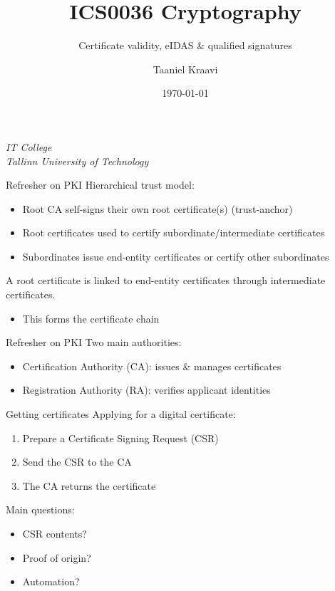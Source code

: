 \graphicspath{ {../../images/} }
\usetikzlibrary{external}
\usepackage{changepage}

\newlength{\offset}

\title{ICS0036 Cryptography}
\subtitle{Certificate validity, eIDAS \& qualified signatures}
\date{\today}
\author{Taaniel Kraavi}
\institute%
{%
  \textit{IT College}\\
  \textit{Tallinn University of Technology}
}


\begin{frame}
  \titlepage
\end{frame}

\begin{frame}{Refresher on PKI}
  Hierarchical trust model:
  \begin{itemize}[<+(1)->]
    \item Root CA self-signs their own root certificate(s) (trust-anchor)
    \item Root certificates used to certify subordinate/intermediate certificates
    \item Subordinates issue end-entity certificates or certify other subordinates
  \end{itemize}

  \vspace*{1em}

  \pause
  A root certificate is linked to end-entity certificates through intermediate certificates.
  \begin{itemize}[<+(1)->]
    \item This forms the certificate chain
  \end{itemize}
\end{frame}

\begin{frame}{Refresher on PKI}
  Two main authorities:
  \begin{itemize}[<+(1)->]
    \item Certification Authority (CA): issues \& manages certificates
    \item Registration Authority (RA): verifies applicant identities
  \end{itemize}
\end{frame}

\begin{frame}{Getting certificates}
  Applying for a digital certificate:
  \begin{enumerate}[<+(1)->]
    \item Prepare a Certificate Signing Request (CSR)
    \item Send the CSR to the CA
    \item The CA returns the certificate
  \end{enumerate}

  \vspace*{1em}

  \pause
  Main questions:
  \begin{itemize}
    \item CSR contents?
    \item Proof of origin?
    \item Automation?
  \end{itemize}
\end{frame}

